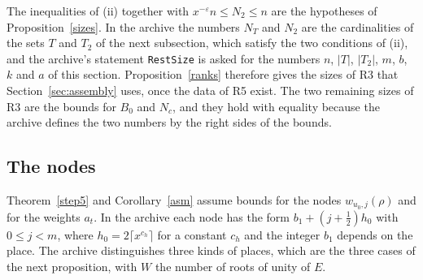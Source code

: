 \documentclass[11pt,letterpaper]{article}
\numberwithin{equation}{section}
\begin{document}
The inequalities of (ii) together with $x^{-\varepsilon}n\le N_2\le n$ are the hypotheses of Proposition~\ref{sizes}. In the archive the numbers $N_T$ and $N_2$ are the cardinalities of the sets $T$ and $T_2$ of the next subsection, which satisfy the two conditions of (ii), and the archive's statement \texttt{RestSize} is asked for the numbers $n$, $|T|$, $|T_2|$, $m$, $b$, $k$ and $a$ of this section. Proposition~\ref{ranks} therefore gives the sizes of R3 that Section~\ref{sec:assembly} uses, once the data of R5 exist. The two remaining sizes of R3 are the bounds for $B_0$ and $N_c$, and they hold with equality because the archive defines the two numbers by the right sides of the bounds.

\subsection{The nodes}

Theorem~\ref{step5} and Corollary~\ref{asm} assume bounds for the nodes $w_{u_0,j}(\rho)$ and for the weights $a_t$. In the archive each node has the form $b_1+(j+\tfrac12)h_0$ with $0\le j<m$, where $h_0=2\lceil x^{c_h}\rceil$ for a constant $c_h$ and the integer $b_1$ depends on the place. The archive distinguishes three kinds of places, which are the three cases of the next proposition, with $W$ the number of roots of unity of $E$.
\end{document}
